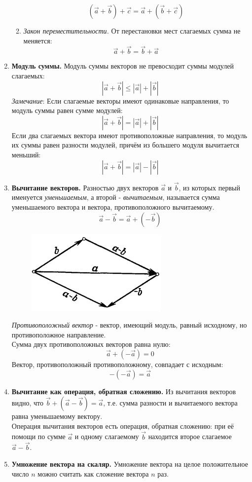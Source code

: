 \documentclass{article}
\begin{document}
\begin{enumerate}
\begin{enumerate}
        $$(\vec{a}+\vec{b})+\vec{c} = \vec{a} + (\vec{b}+\vec{c})$$
        \item \textit{Закон переместительности.} От перестановки мест слагаемых сумма не меняется:
        $$\vec{a}+\vec{b} = \vec{b}+\vec{a}$$
    \end{enumerate}
  \item \textbf{Модуль суммы.} Модуль суммы векторов не превосходит суммы модулей слагаемых:
  $$|\vec{a}+\vec{b}| \leqslant |\vec{a}| + |\vec{b}|$$
  \textit{Замечание}: Если слагаемые векторы имеют одинаковые направления, то модуль суммы равен сумме модулей: 
  $$|\vec{a}+\vec{b}| = |\vec{a}| + |\vec{b}|$$
  Если два слагаемых вектора имеют противоположные направления, то модуль их суммы равен разности модулей, причём из большего модуля вычитается меньший:
  $$|\vec{a}+\vec{b}| = |\vec{a}| - |\vec{b}|$$
  \item \textbf{Вычитание векторов.} Разностью двух векторов $\vec{a}$ и $\vec{b}$, из которых первый именуется \textit{уменьшаемым}, а второй - \textit{вычитаемым}, называется сумма уменьшаемого вектора и вектора, противоположного вычитаемому.
  $$\vec{a}-\vec{b} = \vec{a}+(-\vec{b})$$
  \begin{figure}[H]
      \centering
      \includegraphics[width=0.26\linewidth]{image1_7.png}
  \end{figure}
  \textit{Противоположный вектор} - вектор, имеющий модуль, равный исходному, но противоположное направление.\\
  Сумма двух противоположных векторов равна нулю:
  $$\vec{a}+(-\vec{a}) = 0$$
  Вектор, противоположный противоположному, совпадает с исходным:
  $$-(-\vec{a}) = \vec{a}$$
  \item \textbf{Вычитание как операция, обратная сложению.} Из вычитания векторов видно, что $ \vec{b} + (\vec{a} - \vec{b}) = \vec{a}$, т.е. сумма разности и вычитаемого вектора равна уменьшаемому вектору. \\
  Операция вычитания векторов есть операция, обратная сложению: при её помощи по сумме $\vec{a}$ и одному слагаемому $\vec{b}$ находится второе слагаемое $\vec{a} - \vec{b}$.
  \item \textbf{Умножение вектора на скаляр.} Умножение вектора на целое положительное число $n$ можно считать как сложение вектора $n$ раз. \\

\end{enumerate}
\end{document}
